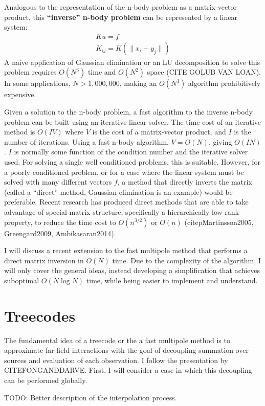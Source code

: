 \documentclass[10pt]{article}
\begin{document}
Analogous to the representation of the n-body problem as a matrix-vector product, this \textbf{``inverse'' n-body problem} can be represented by a linear system:
\begin{eqnarray}
    Ku = f \\
    K_{ij} = K(\|x_i - y_j\|)
\end{eqnarray}
A naive application of Gaussian elimination or an LU decomposition to solve this problem requires $O(N^3)$ time and $O(N^2)$ space (CITE GOLUB VAN LOAN). In some applications, $N > 1,000,000$, making an $O(N^3)$ algorithm prohibitively expensive.

Given a solution to the n-body problem, a fast algorithm to the inverse n-body problem can be built using an iterative linear solver. The time cost of an iterative method is $O(IV)$ where $V$ is the cost of a matrix-vector product, and $I$ is the number of iterations. Using a fast n-body algorithm, $V = O(N)$, giving $O(IN)$. $I$ is normally some function of the condition number and the iterative solver used. For solving a single well conditioned problems, this is suitable. However, for a poorly conditioned problem, or for a case where the linear system must be solved with many different vectors $f$, a method that directly inverts the matrix (called a ``direct'' method, Gaussian elimination is an example) would be preferable. Recent research has produced direct methods that are able to take advantage of special matrix structure, specifically a hierarchically low-rank property, to reduce the time cost to $O(n^{3/2})$ or $O(n)$ (citepMartinsson2005, Greengard2009, Ambikasaran2014).

I will discuss a recent extension to the fast multipole method that performs a direct matrix inversion in $O(N)$ time. Due to the complexity of the algorithm, I will only cover the general ideas, instead developing a simplification that achieves suboptimal $O(N\log{N})$ time, while being easier to implement and understand.

\section*{Treecodes}
The fundamental idea of a treecode or the a fast multipole method is to approximate far-field interactions with the goal of decoupling summation over sources and evaluation of each observation. I follow the presentation by CITEFONGANDDARVE. First, I will consider a case in which this decoupling can be performed globally.

TODO: Better description of the interpolation process.
\end{document}
